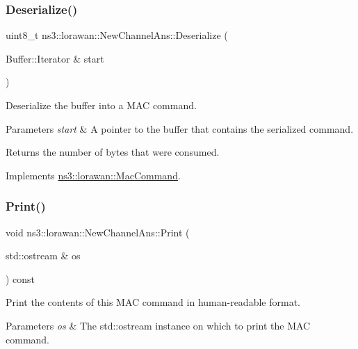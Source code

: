 \subsubsection{\texorpdfstring{Deserialize()}{Deserialize()}}
{\footnotesize\ttfamily uint8\+\_\+t ns3\+::lorawan\+::\+New\+Channel\+Ans\+::\+Deserialize (\begin{DoxyParamCaption}\item[{Buffer\+::\+Iterator \&}]{start }\end{DoxyParamCaption})\hspace{0.3cm}{\ttfamily [virtual]}}

Deserialize the buffer into a M\+AC command.


\begin{DoxyParams}{Parameters}
{\em start} & A pointer to the buffer that contains the serialized command. \\
\hline
\end{DoxyParams}
\begin{DoxyReturn}{Returns}
the number of bytes that were consumed. 
\end{DoxyReturn}


Implements \hyperlink{classns3_1_1lorawan_1_1MacCommand_af12d223a71a67196bce498f1240eda75}{ns3\+::lorawan\+::\+Mac\+Command}.

\mbox{\label{classns3_1_1lorawan_1_1NewChannelAns_ad0528161cddbea57fc0b509b3b76c9b7}} 
\subsubsection{\texorpdfstring{Print()}{Print()}}
{\footnotesize\ttfamily void ns3\+::lorawan\+::\+New\+Channel\+Ans\+::\+Print (\begin{DoxyParamCaption}\item[{std\+::ostream \&}]{os }\end{DoxyParamCaption}) const\hspace{0.3cm}{\ttfamily [virtual]}}

Print the contents of this M\+AC command in human-\/readable format.


\begin{DoxyParams}{Parameters}
{\em os} & The std\+::ostream instance on which to print the M\+AC command. \\
\hline
\end{DoxyParams}


